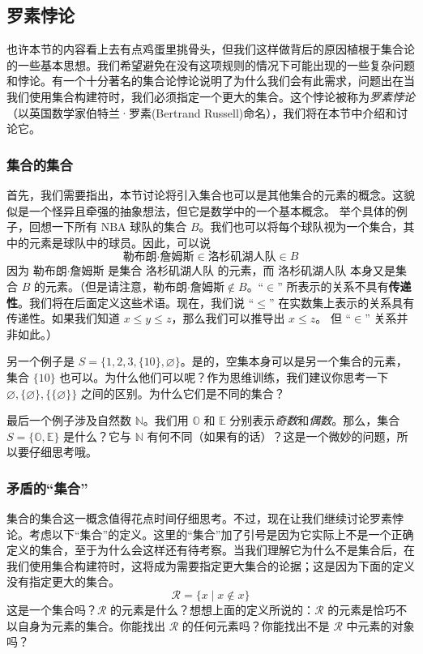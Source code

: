 \subsection{罗素悖论}\label{sec:section3.3.5}

也许本节的内容看上去有点鸡蛋里挑骨头，但我们这样做背后的原因植根于集合论的一些基本思想。我们希望避免在没有这项规则的情况下可能出现的一些复杂问题和悖论。有一个十分著名的集合论悖论说明了为什么我们会有此需求，问题出在当我们使用集合构建符时，我们必须指定一个更大的集合。这个悖论被称为\emph{罗素悖论}（以英国数学家伯特兰·罗素(Bertrand Russell)命名），我们将在本节中介绍和讨论它。

\subsubsection*{集合的集合}

首先，我们需要指出，本节讨论将引入集合也可以是其他集合的元素的概念。这貌似是一个怪异且牵强的抽象想法，但它是数学中的一个基本概念。
举个具体的例子，回想一下所有 NBA 球队的集合 $B$。我们也可以将每个球队视为一个集合，其中的元素是球队中的球员。因此，可以说
\[\text{勒布朗·詹姆斯} \in \text{洛杉矶湖人队} \in B\]
因为 $\text{勒布朗·詹姆斯}$ 是集合 $\text{洛杉矶湖人队}$ 的元素，而 $\text{洛杉矶湖人队}$ 本身又是集合 $B$ 的元素。（但是请注意，$\text{勒布朗·詹姆斯} \notin B$。``$\in$'' 所表示的关系不具有\textbf{传递性}。我们将在后面定义这些术语。现在，我们说 ``$\le$'' 在实数集上表示的关系具有传递性。如果我们知道 $x \le y \le z$，那么我们可以推导出 $x \le z$。 但 ``$\in$'' 关系并非如此。）

另一个例子是 $S = \{1, 2, 3, \{10\}, \varnothing \}$。是的，空集本身可以是另一个集合的元素，集合 $\{10\}$ 也可以。为什么他们可以呢？作为思维训练，我们建议你思考一下 $\varnothing, \{\varnothing\}, \{\{\varnothing\}\}$ 之间的区别。为什么它们是不同的集合？

最后一个例子涉及自然数 $\mathbb{N}$。我们用 $\mathbb{O}$ 和 $\mathbb{E}$ 分别表示\emph{奇数}和\emph{偶数}。那么，集合 $S = \{\mathbb{O}, \mathbb{E}\}$ 是什么？它与 $\mathbb{N}$ 有何不同（如果有的话）？这是一个微妙的问题，所以要仔细思考哦。

\subsubsection*{矛盾的``集合''}

集合的集合这一概念值得花点时间仔细思考。不过，现在让我们继续讨论罗素悖论。考虑以下``集合''的定义。这里的``集合''加了引号是因为它实际上不是一个正确定义的集合，至于为什么会这样还有待考察。当我们理解它为什么不是集合后，在我们使用集合构建符时，这将成为需要指定更大集合的论据；这是因为下面的定义没有指定更大的集合。
\[\mathcal{R} = \{x \mid x \notin x\}\]
这是一个集合吗？$\mathcal{R}$ 的元素是什么？想想上面的定义所说的：$\mathcal{R}$ 的元素是恰巧不以自身为元素的集合。你能找出 $\mathcal{R}$ 的任何元素吗？你能找出不是 $\mathcal{R}$ 中元素的对象吗？


